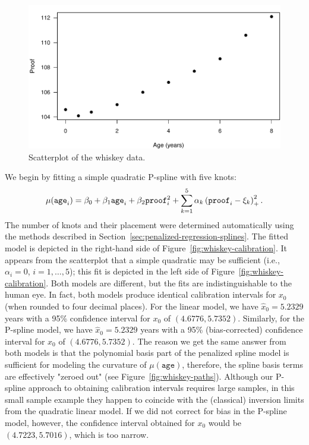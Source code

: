 \documentclass[cmfont,usenames,dvipsnames,leqno]{afit-etd}\usepackage[]{graphicx}\usepackage[]{color}
\makeatletter
\def\maxwidth{ %
  \ifdim\Gin@nat@width>\linewidth
    \linewidth
  \else
    \Gin@nat@width
  \fi
}
\newenvironment{knitrout}{}{} %
\renewenvironment{knitrout}{\begin{singlespace}}{\end{singlespace}}
\newcommand{\wh}[1]{\ensuremath{\widehat{#1}}}
\makeatother
\begin{document}
\begin{knitrout}
\color{fgcolor}\begin{figure}[H]

\includegraphics[width=\maxwidth]{figure/whiskey-scatter} \caption[Scatterplot of the whiskey data]{Scatterplot of the whiskey data.\label{fig:whiskey-scatter}}
\end{figure}


\end{knitrout}


We begin by fitting a simple quadratic \ac{P-spline} with five knots:
\begin{equation*}
  \mu(\text{\texttt{age}}_i) = \beta_0 + \beta_1\text{\texttt{age}}_i + \beta_2\text{\texttt{proof}}_i^2 + \sum_{k = 1}^5\alpha_k\left( \text{\texttt{proof}}_i - \xi_k \right)_+^2.
\end{equation*}
The number of knots and their placement were determined automatically using the methods described in Section~\ref{sec:penalized-regression-splines}. The fitted model is depicted in the right-hand side of Figure~\ref{fig:whiskey-calibration}. It appears from the scatterplot that a simple quadratic may be sufficient (i.e., $\alpha_i = 0$, $i = 1, \dotsc, 5$); this fit is depicted in the left side of Figure~\ref{fig:whiskey-calibration}. Both models are different, but the fits are indistinguishable to the human eye. In fact, both models produce identical calibration intervals for $x_0$ (when rounded to four decimal places). For the linear model, we have $\wh{x}_0 = 5.2329$ years with a 95\% confidence interval for $x_0$ of $(4.6776, 5.7352)$. Similarly, for the \ac{P-spline} model, we have $\wh{x}_0 = 5.2329$ years with a 95\% (bias-corrected) confidence interval for $x_0$ of $(4.6776, 5.7352)$. The reason we get the same answer from both models is that the polynomial basis part of the penalized spline model is sufficient for modeling the curvature of $\mu(\texttt{age})$, therefore, the spline basis terms are effectively "zeroed out" (see Figure~\ref{fig:whiskey-paths}). Although our \ac{P-spline} approach to obtaining calibration intervals requires large samples, in this small sample example they happen to coincide with the (classical) inversion limits from the quadratic linear model. If we did not correct for bias in the \ac{P-spline} model, however, the confidence interval obtained for $x_0$ would be $(4.7223, 5.7016)$, which is too narrow.
\end{document}
